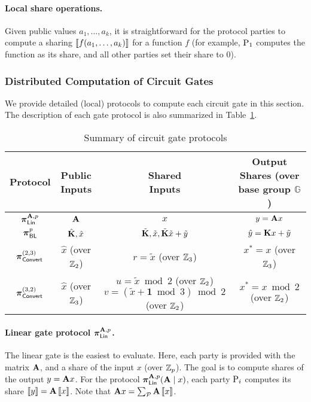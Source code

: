 \paragraph{Local share operations.}
Given public values $a_1, \dots, a_k$, it is straightforward for the protocol parties to compute a sharing $\left\llbracket f(a_1, \dots, a_k) \right\rrbracket$ for a function $f$ (for example, $\textnormal{P}_1$ computes the function as its share, and all other parties set their share to $0$).

\subsubsection{Distributed Computation of Circuit Gates}

We provide detailed (local) protocols to compute each circuit gate in this section. The description of each gate protocol is also summarized in Table~\ref{table:gate_protocol_summary}.


\begin{table}[h]
\centering
{
\renewcommand{\arraystretch}{1.5}
\begin{tabular}{|c|c|c|c|}

\hline
Protocol & \makecell{Public \\ Inputs} & \makecell{Shared \\ Inputs} & \makecell{Output Shares \\ (over base group $\mathbb{G}$)} \\
\hline
$\prot_{\LMap}^{\mat{A},p}$ & $\mat{A}$ & $x$ & $y = \mat{A}x$\\
\hline
$\boldsymbol{\pi}_{\textsf{BL}}^p$ & $\hat{\mat{K}}, \hat{x}$ & $\tilde{\mat{K}},\tilde{x}, \tilde{\mat{K}}\tilde{x} + \tilde{y}$ & $\hat{y} = \mat{K}x + \tilde{y}$\\
\hline
$\boldsymbol{\pi}_{\textsf{Convert}}^{(2,3)}$ & $\hat{x}$ (over $\mathbb{Z}_2$) & $r = \tilde{x}$ (over $\mathbb{Z}_3$) & $x^* = x$ (over $\mathbb{Z}_3$) \\
\hline
$\boldsymbol{\pi}_{\textsf{Convert}}^{(3,2)}$ & $\hat{x}$ (over $\mathbb{Z}_3$) & \makecell{$u = \tilde{x} \bmod 2$ (over $\mathbb{Z}_2$) \\ $v = (\tilde{x} + \textbf{1} \bmod 3) \bmod 2$ (over $\mathbb{Z}_2$)} & $x^* = x \bmod 2$ (over $\mathbb{Z}_2$) \\
\hline
\end{tabular}
}
\caption{Summary of circuit gate protocols}
\label{table:gate_protocol_summary}
\end{table}


\paragraph{Linear gate protocol $\prot_\LMap^{\mat{A}, p}$.}
The linear gate is the easiest to evaluate. Here, each party is provided with the matrix $\mat{A}$, and a share of the input $x$ (over $\mathbb{Z}_p$). The goal is to compute shares of the output $y = \mat{A}x$. For the protocol $\prot_\LMap^{\mat{A}, p}(\mat{A} \mid x)$, each party $\textnormal{P}_i$ computes its share $\share{y} = \mat{A}\share{x}$. Note that $\mat{A}x = \sum_{\parties}\mat{A}\share{x}$.

